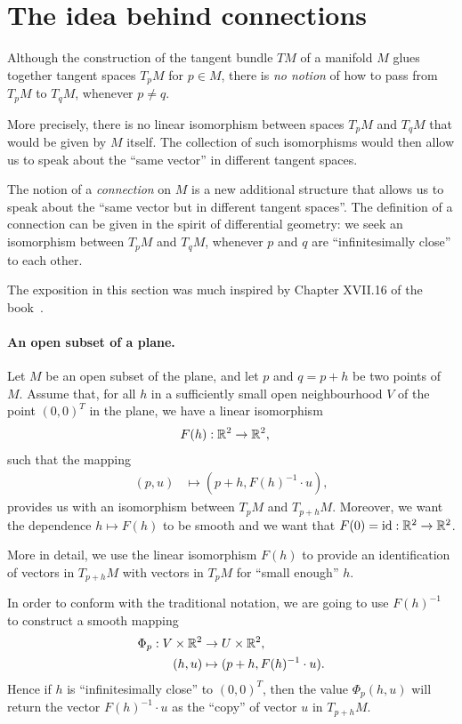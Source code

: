 \documentclass[11pt,a4paper,twoside,openany]{report}
\theoremstyle{my-theorem}
\theoremstyle{non-theorem}
\begin{document}
		
		\section{The idea behind connections}
		\label{sec:the-idea-behind connections}
		
			Although the construction of the tangent bundle $TM$ of a manifold $M$ glues together tangent spaces $T_pM$ for $p \in M$, there is \emph{no notion} of how to pass from $T_pM$ to $T_qM$, whenever $p \neq q$.
			
			More precisely, there is no linear isomorphism between spaces $T_pM$ and $T_qM$ that would be given by $M$ itself. The collection of such isomorphisms would then allow us to speak about the ``same vector'' in different tangent spaces.
			
			The notion of a \emph{connection} on $M$ is a new additional structure that allows us to speak about the ``same vector but in different tangent spaces''. The definition of a connection can be given in the spirit of differential geometry: we seek an isomorphism between $T_pM$ and $T_qM$, whenever $p$ and $q$ are ``infinitesimally close'' to each other.
			
			The exposition in this section was much inspired by Chapter XVII.16 of the book~\cite{dieudonne:treatise-on-analysis}.
			
			\paragraph*{An open subset of a plane.} Let $M$ be an open subset of the plane, and let $p$ and $q=p+h$ be two points of $M$. Assume that, for all $h$ in a sufficiently small open neighbourhood $V$ of the point $(0,0)^T$ in the plane, we have a linear isomorphism
			\begin{align*}
				F(h): {\mathbb R}^2 &\to {\mathbb R}^2,
			\end{align*}
			such that the mapping
			\begin{align*}
				(p,u) &\mapsto (p+h,F(h)^{-1}\cdot u),
			\end{align*}
			provides us with an isomorphism between $T_pM$ and $T_{p+h}M$. Moreover, we want the dependence $h \mapsto F(h)$ to be smooth and we want that $F(0) = \operatorname{id}: {\mathbb R}^2 \to {\mathbb R}^2$.
			
			More in detail, we use the linear isomorphism $F(h)$ to provide an identification of vectors in $T_{p+h}M$ with vectors in $T_pM$ for ``small enough'' $h$.
			
			In order to conform with the traditional notation, we are going to use $F(h)^{-1}$ to construct a smooth mapping
			\begin{align*}
				\Phi_p: V \times {\mathbb R}^2 &\to U \times {\mathbb R}^2,
			\\
				(h,u) &\mapsto (p+h,F(h)^{-1}\cdot u).
			\end{align*}
			Hence if $h$ is ``infinitesimally close'' to $(0,0)^T$, then the value $\Phi_p(h,u)$ will return the vector $F(h)^{-1} \cdot u$ as the ``copy'' of vector $u$ in $T_{p+h}M$.
			
\end{document}
